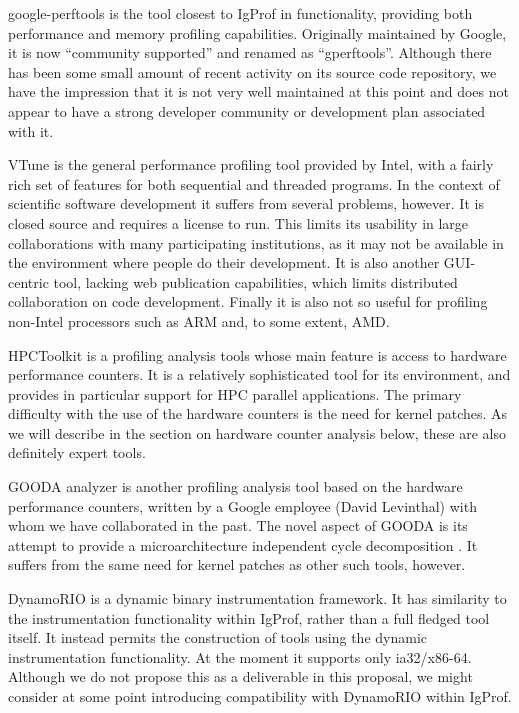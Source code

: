 \documentclass[notitlepage,letter,12pt]{article}
\begin{document}
google-perftools \cite{GPERFTOOLS} is the tool closest to IgProf in
functionality, providing both performance and memory profiling capabilities.
Originally maintained by Google, it is now ``community supported'' and
renamed as ``gperftools''.
Although there has been some small amount of recent activity on its
source code repository, we have the impression that it is not very well
maintained at this point and does not appear to have a strong developer
community or development plan associated with it.

VTune \cite{VTUNE} is the general performance profiling tool provided by
Intel, with a fairly rich set of features for both sequential and
threaded programs. In the context of scientific software development it
suffers from several problems, however. It is closed source and requires a
license to run. This limits its usability in large collaborations with
many participating institutions, as it may not be available in the
environment where people do their development. It is also another
GUI-centric tool, lacking web publication capabilities, which limits
distributed collaboration on code development.  Finally it is also
not so useful for profiling non-Intel processors such as ARM and,
to some extent, AMD.

HPCToolkit \cite{HPCTOOLKIT} is a profiling analysis tools whose main 
feature is access to hardware performance counters. It is a relatively 
sophisticated tool for its environment, and provides in particular 
support for HPC parallel applications. The primary difficulty with the 
use of the hardware counters is the need for kernel patches. As we will 
describe in the section on hardware counter analysis below, these are 
also definitely expert tools.

GOODA \cite{GOODA} analyzer is another profiling analysis tool based on
the hardware performance counters, written by a Google employee (David 
Levinthal) with whom we have collaborated in the past. The novel
aspect of GOODA is its attempt to provide a microarchitecture independent
cycle decomposition \cite{GOODACYCLEACCT}. It suffers from the same
need for kernel patches as other such tools, however. 

DynamoRIO \cite{DYNAMORIO} is a dynamic binary
instrumentation framework. It has similarity to the instrumentation 
functionality
within IgProf, rather than a full fledged tool itself. It instead
permits the construction of tools using the dynamic instrumentation
functionality. At the moment it supports only ia32/x86-64. Although we do
not propose this as a deliverable in this proposal, we might consider
at some point introducing compatibility with DynamoRIO within IgProf.
\end{document}
